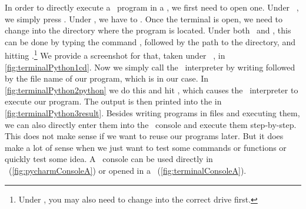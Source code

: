 %
%
\label{sec:terminalPython}%
In order to directly execute a \python\ program in a , we first need to open one.
Under \ubuntu\ \linux, we simply press \ubuntuTerminal.
Under \windows, we have to \windowsTerminal.
Once the terminal is open, we need to change into the directory where the program is located.
Under both \linux\ and \windows, this can be done by typing the command , followed by the path to the directory, and hitting \keys{\enter}.\footnote{%
Under \windows, you may also need to change into the correct drive first.}
We provide a screenshot for that, taken under \ubuntu\ \linux, in \cref{fig:terminalPython1cd}.
Now we simply call the \python\ interpreter by writing  followed by the file name of our program, which is  in our case.
In \cref{fig:terminalPython2python} we do this and hit \keys{\enter}, which causes the \python\ interpreter to execute our program.
The output  is then printed into the  in \cref{fig:terminalPython3result}.%
\endhsection%
%
%
\label{sec:pycharmConsole}%
Besides writing programs in files and executing them, we can also directly enter them into the \python\ console and execute them step-by-step.
This does not make sense if we want to reuse our programs later.
But it does make a lot of sense when we just want to test some commands or functions or quickly test some idea.
A \python\ console can be used directly in \pycharm~(\cref{fig:pycharmConsoleA}) or opened in a ~(\cref{fig:terminalConsoleA}).

